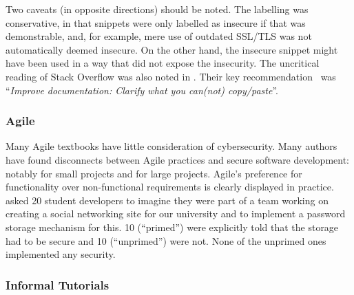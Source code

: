 \documentclass[sigconf]{acmart}
\begin{document}
Two caveats (in opposite directions) should be noted. The labelling was conservative, in that snippets were only labelled as insecure if that was demonstrable, and, for example, mere use of outdated SSL/TLS was not automatically deemed insecure. On the other hand, the insecure snippet might have been used in a way that did not expose the insecurity. The uncritical reading of Stack Overflow was also noted in \cite[Slide 29]{Votipkaetal2019a}. Their key recommendation~\cite[Slide 32]{Votipkaetal2019a} was ``{\emph{Improve documentation: Clarify what you can(not) copy/paste}}''. 

\subsubsection{Agile}
Many Agile textbooks have little consideration of cybersecurity. Many authors have found disconnects between Agile practices and secure software development: notably \cite{Bartsch2011a} for small projects and \cite{vanderHeijden:2018:EPS:3239235.3267426} for large projects. Agile's preference for functionality over non-functional requirements is clearly displayed in practice. \cite{Naiakshinaetal2017a} asked 20 student developers to imagine they were part of a team working on creating a social networking site for our university and to implement a password storage mechanism for this. 10 (``primed'') were explicitly told that the storage had to be secure and 10 (``unprimed'') were not. None of the unprimed ones implemented any security. 

\subsubsection{Informal Tutorials}  %
\begin{comment}
took out foot notes for space
The web abounds with informal resources, such as tutorials as well as code snippets. How good are these, and how good are people at using these? This has been looked at by \cite{Unruhetal2017a}, taking the top five search results from Google for six queries. Of these 30 tutorials, six had SQL injection weaknesses, and three had Cross-Site Scripting\footnote{Number 7 in OWASP's Top Ten \cite{OWASP2017a}.} weaknesses. Searching for these fragments in PHP projects on GitHub found 820 instances of these fragments, of which 117 were verified manually to be vulnerable --- 80\% of which were vulnerable to SQL injection. Some students clearly make use of these resources; thus a recommendation of future work is to explore and evaluate students' (and indeed others') use of such informal resources. 
\end{comment}
\end{document}
